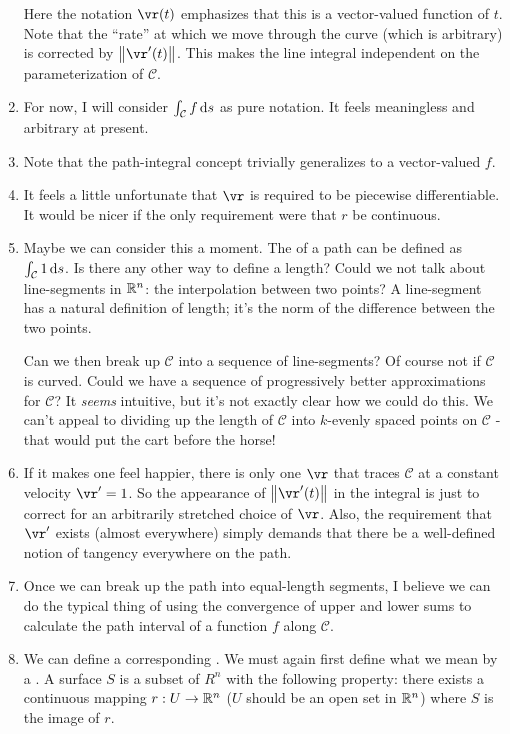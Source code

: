 \documentclass[11pt, oneside]{amsart}
\newcommand{\calC}{\mathcal{C}}
\begin{document}
\begin{enumerate}
\noindent
Here the notation $\vr(t)$ emphasizes that this is a vector-valued
function of $t$. Note that the ``rate'' at which we move through the
curve (which is arbitrary) is corrected by $\norm{\vr'(t)}$. This makes
the line integral independent on the parameterization of $\calC$.

\item For now, I will consider $\int_\calC f \diff{s}$ as pure
notation. It feels meaningless and arbitrary at present.

\item Note that the path-integral concept trivially generalizes to a
vector-valued $f$.

\item It feels a little unfortunate that $\vr$ is required to be
piecewise differentiable. It would be nicer if the only requirement were
that $r$ be continuous.

\item Maybe we can consider this a moment. The  of a path
can be defined as $\int_\calC 1 \diff{s}$. Is there any other way
to define a length? Could we not talk about line-segments in $\mathbb{R}^n$: the
interpolation between two points? A line-segment has a natural
definition of length; it's the norm of the difference between the two
points.

Can we then break up $\calC$ into a sequence of line-segments? Of course
not if $\calC$ is curved. Could we have a sequence of progressively
better approximations for $\calC$? It \emph{seems} intuitive, but it's
not exactly clear how we could do this. We can't appeal to dividing up
the length of $\calC$ into $k$-evenly spaced points on $\calC$ - that
would put the cart before the horse!

\item If it makes one feel happier, there is only one $\vr$ that traces
$\mathcal{C}$ at a constant velocity $\vr' = 1$. So the appearance of
$\norm{\vr'(t)}$ in the integral is just to correct for an arbitrarily
stretched choice of $\vr$. Also, the requirement that $\vr'$ exists
(almost everywhere) simply demands that there be a well-defined notion
of tangency everywhere on the path.

\item Once we can break up the path into equal-length segments, I
believe we can do the typical thing of using the convergence of upper
and lower sums to calculate the path interval of a function $f$ along
$\calC$.

\item We can define a corresponding . We must
again first define what we mean by a . A surface $S$ is
a subset of $R^n$ with the following property: there exists a continuous
mapping $r: U \to \mathbb{R}^n$ ($U$ should be an open set in $\mathbb{R}^n$) where
$S$ is the image of $r$.


\end{enumerate}
\end{document}

